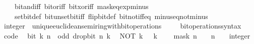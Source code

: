 \begin{isabellebody}
\ \ \ \ bit{\isacharunderscore}{\kern0pt}and{\isacharunderscore}{\kern0pt}iff\ bit{\isacharunderscore}{\kern0pt}or{\isacharunderscore}{\kern0pt}iff\ bit{\isacharunderscore}{\kern0pt}xor{\isacharunderscore}{\kern0pt}iff\ mask{\isacharunderscore}{\kern0pt}eq{\isacharunderscore}{\kern0pt}exp{\isacharunderscore}{\kern0pt}minus{\isacharunderscore}{\kern0pt}{}\isanewline
\ \ \ \ set{\isacharunderscore}{\kern0pt}bit{\isacharunderscore}{\kern0pt}def\ bit{\isacharunderscore}{\kern0pt}unset{\isacharunderscore}{\kern0pt}bit{\isacharunderscore}{\kern0pt}iff\ flip{\isacharunderscore}{\kern0pt}bit{\isacharunderscore}{\kern0pt}def\ bit{\isacharunderscore}{\kern0pt}not{\isacharunderscore}{\kern0pt}iff{\isacharunderscore}{\kern0pt}eq\ minus{\isacharunderscore}{\kern0pt}eq{\isacharunderscore}{\kern0pt}not{\isacharunderscore}{\kern0pt}minus{\isacharunderscore}{\kern0pt}{}{\isacharparenright}{\kern0pt}{\isacharplus}{\kern0pt}%
\endisatagproof
{\isafoldproof}%
%
\isadelimproof
%
\endisadelimproof
\isanewline
\isanewline
{}\isamarkupfalse%
\isanewline
\isanewline
{}\isamarkupfalse%
\ integer\ {\isacharcolon}{\kern0pt}{\isacharcolon}{\kern0pt}\ unique{\isacharunderscore}{\kern0pt}euclidean{\isacharunderscore}{\kern0pt}semiring{\isacharunderscore}{\kern0pt}with{\isacharunderscore}{\kern0pt}bit{\isacharunderscore}{\kern0pt}operations%
\isadelimproof
\ %
\endisadelimproof
%
\isatagproof
\isacommand{{\isachardot}{\kern0pt}{\isachardot}{\kern0pt}}\isamarkupfalse%
%
\endisatagproof
{\isafoldproof}%
%
\isadelimproof
%
\endisadelimproof
\isanewline
\isanewline
{}\isamarkupfalse%
\isanewline
\ \ \ bit{\isacharunderscore}{\kern0pt}operations{\isacharunderscore}{\kern0pt}syntax\isanewline
{}\isanewline
\isanewline
{}\isamarkupfalse%
\ {\isacharbrackleft}{\kern0pt}code{\isacharbrackright}{\kern0pt}{\isacharcolon}{\kern0pt}\isanewline
\ \ {\isacartoucheopen}bit\ k\ n\ {\isasymlongleftrightarrow}\ odd\ {\isacharparenleft}{\kern0pt}drop{\isacharunderscore}{\kern0pt}bit\ n\ k{\isacharparenright}{\kern0pt}{\isacartoucheclose}\isanewline
\ \ {\isacartoucheopen}NOT\ k\ {\isacharequal}{\kern0pt}\ {\isacharminus}{\kern0pt}\ k\ {\isacharminus}{\kern0pt}\ {}{\isacartoucheclose}\isanewline
\ \ {\isacartoucheopen}mask\ n\ {\isacharequal}{\kern0pt}\ {}\ {\isacharcircum}{\kern0pt}\ n\ {\isacharminus}{\kern0pt}\ {\isacharparenleft}{\kern0pt}{}\ {\isacharcolon}{\kern0pt}{\isacharcolon}{\kern0pt}\ integer{\isacharparenright}{\kern0pt}{\isacartoucheclose}\isanewline

\end{isabellebody}
